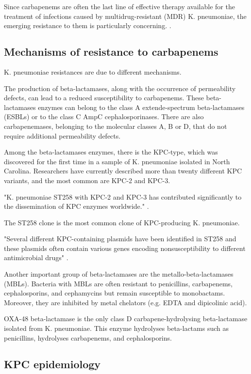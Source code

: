 \documentclass[11pt]{report}
\begin{document}
Since carbapenems are often the last line of effective therapy available for the treatment of infections caused by multidrug-resistant (MDR) K. pneumoniae, the emerging resistance to them is particularly concerning.
 \cite{Pitout2015}.

\subsection{Mechanisms of resistance to carbapenems} 


K. pneumoniae resistances are due to different mechanisms.

The production of beta-lactamases, along with the occurrence of permeability defects, can lead to a reduced susceptibility to carbapenems.
These beta-lactamases enzymes can belong to the class A extende-spectrum beta-lactamases (ESBLs) or to the class C AmpC cephalosporinases.
There are also carbapenemases, belonging to the molecular classes A, B or D, that do not require additional permeability defects.

Among the beta-lactamases enzymes, there is the KPC-type, which was discovered for the first time in a sample of K. pneumoniae isolated in North Carolina.
Researchers have currently described more than twenty different KPC variants, and the most common are KPC-2 and KPC-3.

"K. pneumoniae ST258 with KPC-2 and KPC-3 has contributed significantly to the dissemination of KPC enzymes worldwide."
\cite{Pitout2015}.

The ST258 clone is the most common clone of KPC-producing K. pneumoniae.

"Several different KPC-containing plasmids have been identified in ST258 and these plasmids often contain various genes encoding nonsusceptibility to different antimicrobial drugs" \cite{Pitout2015}.

Another important group of beta-lactamases are the metallo-beta-lactamases (MBLs). Bacteria with MBLs are often resistant to penicillins, carbapenems, cephalosporins, and cephamycins but remain susceptible to monobactams. Moreover, they are inhibited by metal chelators (e.g. EDTA and dipicolinic acid).

OXA-48 beta-lactamase is the only class D carbapene-hydrolysing beta-lactamase isolated from K. pneumoniae. This enzyme hydrolyses beta-lactams such as penicillins, hydrolyses carbapenems, and cephalosporins.


\subsection{KPC epidemiology}
\end{document}
